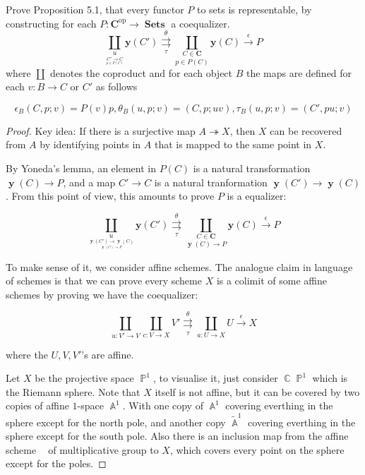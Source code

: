 \documentclass[a4paper]{article}
\DeclareMathOperator{\Sets}{\mathbf {Sets}}
\DeclareMathOperator{\op}{op}
\DeclareMathOperator{\y}{\mathbf y}
\DeclareMathOperator{\Cn}{\mathbb C}
\DeclareMathOperator{\Ps}{\mathbb P}
\DeclareMathOperator{\An}{\mathbb A}
\DeclareMathOperator{\Gm}{\mathbb G_m}
\begin{document}
\begin{question}
    Prove Proposition 5.1, that every functor $P$ to sets is representable, by constructing for each $P: \mathbf C^{\op} \to \Sets$ a coequalizer.
    $$\underset{\underset{\underset{p\in P(C)}{C'\to C}}u}\coprod \mathbf y (C')\overset{\theta}{\underset{\tau}\rightrightarrows}\underset{p\in P(C)}{\underset{C\in \mathbf C}\coprod}{\mathbf y(C)}\overset{\epsilon}\to P$$
    where $\coprod$ denotes the coproduct and for each object $B$ the maps are defined for each $v:B\to C$ or $C'$ as follows

    $$\epsilon_B(C,p;v)=P(v)p, \theta_B(u,p;v)=(C,p;uv),\tau_B(u,p;v)=(C',pu;v)$$
\end{question}
   \begin{proof}

       Key idea: If there is a surjective map $A\twoheadrightarrow X$, then $X$ can be recovered from $A$ by identifying points in $A$ that is mapped to the same point in $X$.

       By Yoneda's lemma, an element in $P(C)$ is a natural transformation $\y (C) \to P$, and a map $C'\to C$ is a natural tranformation $\y (C')\to \y(C)$. From this point of view, this amounts to prove $P$ is a equalizer:

       $$\underset{\underset{\underset{\y(C)\to P}{\y(C')\to \y(C)}}u}\coprod \mathbf y (C')\overset{\theta}{\underset{\tau}\rightrightarrows}\underset{\y(C)\to P}{\underset{C\in \mathbf C}\coprod}{\mathbf y(C)}\overset{\epsilon}\to P$$

       To make sense of it, we consider affine schemes. The analogue claim in language of schemes is that we can prove every scheme $X$ is a colimit of some affine schemes by proving we have the coequalizer:

       $$\underset{u:V'\to V}\coprod\underset{c:V\to X}\coprod V'\overset{\theta}{\underset{\tau}\rightrightarrows}\underset{a:U\to X}\coprod U\overset{\epsilon}\to X$$

       where the $U,V,V'$'s are affine.

       Let $X$ be the projective space $\Ps^1$, to visualise it, just consider $\Cn\Ps^1$ which is the Riemann sphere. Note that $X$ itself is not affine, but it can be covered by two copies of affine $1$-space $\An^1$. With one copy of $\An^1$ covering everthing in the sphere except for the north pole, and another copy $\widetilde{\An}^1$ covering everthing in the sphere except for the south pole. Also there is an inclusion map from the affine scheme $\Gm$ of multiplicative group to $X$, which covers every point on the sphere except for the poles.


\end{proof}
\end{document}
